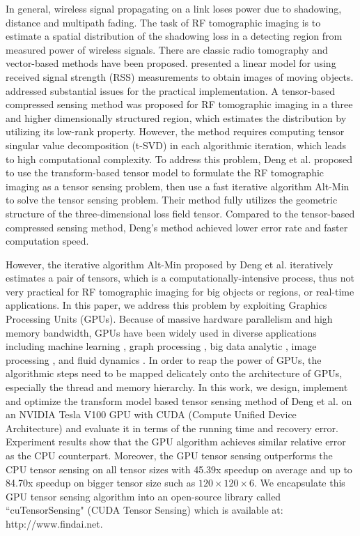 \documentclass[futureinternet,article,submit,moreauthors,pdftex,10pt,a4paper]{Definitions/mdpi}
\theoremstyle{plain}
\theoremstyle{definition}
\theoremstyle{remark}
\begin{document}
In general, wireless signal propagating on a link loses power due to shadowing, distance and multipath fading. The task of RF tomographic imaging is to estimate a spatial distribution of the shadowing loss in a detecting region from measured power of wireless signals. There are classic radio tomography and vector-based methods have been proposed. \cite{wilson2010radio} presented a linear model for 
using received signal strength (RSS) measurements to obtain images of moving objects. \cite{beck2016ultrawideband} addressed substantial issues for the practical 
implementation. A tensor-based compressed sensing method \cite{matsuda2017multi} was proposed for RF tomographic imaging in a three and higher dimensionally structured region, which estimates the distribution by utilizing its low-rank property. However, the method requires computing tensor singular value decomposition (t-SVD) in each algorithmic iteration, which leads to high computational complexity. To address this problem, Deng et al. \cite{deng2018tensor} proposed to use the transform-based tensor model to formulate the RF tomographic imaging as a tensor sensing problem, then use a fast iterative algorithm Alt-Min to solve the tensor sensing problem. Their method fully utilizes the geometric structure of the three-dimensional loss field tensor. Compared to the tensor-based compressed sensing method, Deng's method achieved lower error rate and faster computation speed.

However, the iterative algorithm Alt-Min proposed by Deng et al.\cite{deng2018tensor} iteratively estimates a pair of tensors, which is a computationally-intensive process, thus not very practical for RF tomographic imaging for big objects or regions, or real-time applications. In this paper, we address this problem by exploiting Graphics Processing Units (GPUs). Because of massive hardware parallelism and high memory bandwidth, GPUs have been widely used in diverse applications including machine learning \cite{cui2016geeps} \cite{brito2017detecting} \cite{campos2017scaling}, graph processing \cite{shi2018frog} \cite{zhong2017optimizing} \cite{pan2017multi}, big data analytic \cite{gutierrez2017smote} \cite{rathore2017real}, image processing \cite{devadithya2017gpu}, and fluid dynamics \cite{verma2017advanced}. In order to reap the power of GPUs, the algorithmic steps need to be mapped delicately onto the architecture of GPUs, especially the thread and memory hierarchy.  In this work, we design, implement and optimize the transform model based tensor sensing method of Deng et al. \cite{deng2018tensor} on an NVIDIA Tesla V100 GPU with CUDA (Compute Unified Device Architecture) and evaluate it in terms of the running time and recovery error. Experiment results show that the GPU algorithm achieves similar relative error as the CPU counterpart. Moreover, the GPU tensor sensing outperforms the CPU tensor sensing on all tensor sizes with 45.39x speedup on average and up to 84.70x speedup on bigger tensor size such as $120 \times 120 \times 6$. We encapsulate this GPU tensor sensing algorithm into an open-source library called ``cuTensorSensing" (CUDA Tensor Sensing) which is available at: http://www.findai.net.
\end{document}
